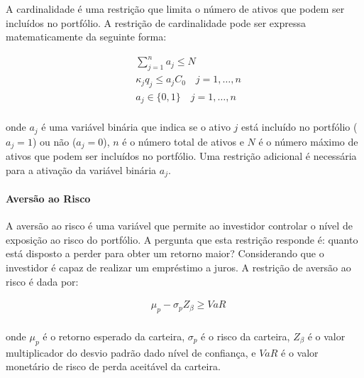                     \ipar A cardinalidade é uma restrição que limita o número de ativos que podem ser incluídos no portfólio. A restrição de cardinalidade pode ser expressa matematicamente da seguinte forma:

                    \begin{equation}
                        \begin{aligned}
                            & \sum_{j=1}^{n} a_{j} \leq N \\
                            &\kappa_{j} q_{j} \leq a_{j} C_{0} \quad j=1, \ldots, n \\
                            & a_{j} \in\{0,1\} \quad j=1, \ldots, n \\
                        \end{aligned}
                    \end{equation}

                    \noindent onde $a_{j}$ é uma variável binária que indica se o ativo $j$ está incluído no portfólio ($a_{j}=1$) ou não ($a_{j}=0$), $n$ é o número total de ativos e $N$ é o número máximo de ativos que podem ser incluídos no portfólio. Uma restrição adicional é necessária para a ativação da variável binária $a_{j}$.
                    
                \paragraph{Aversão ao Risco}

                    \ipar A aversão ao risco é uma variável que permite ao investidor controlar o nível de exposição ao risco do portfólio. A pergunta que esta restrição responde é: quanto está disposto a perder para obter um retorno maior? Considerando que o investidor é capaz de realizar um empréstimo a juros. A restrição de aversão ao risco é dada por:
                    
                    \begin{equation}
                        \begin{aligned}
                            & \mu_{p} - \sigma_{p} Z_\beta \geq VaR \\
                        \end{aligned}
                    \end{equation}

                    \noindent onde $\mu_{p}$ é o retorno esperado da carteira, $\sigma_{p}$ é o risco da carteira, $Z_\beta$ é o valor multiplicador do desvio padrão dado nível de confiança, e $VaR$ é o valor monetário de risco de perda aceitável da carteira.

